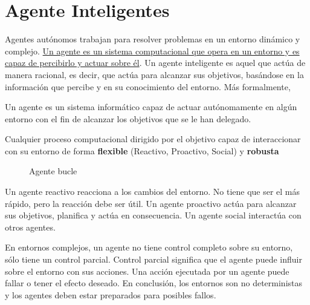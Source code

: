 \chapter{Agente Inteligentes}

Agentes autónomos trabajan para resolver problemas en un entorno dinámico y complejo. \ul{Un agente es un sistema computacional que opera en un entorno y es capaz de percibirlo y actuar sobre él}. Un agente inteligente es aquel que actúa de manera racional, es decir, que actúa para alcanzar sus objetivos, basándose en la información que percibe y en su conocimiento del entorno.
Más formalmente,
\begin{definition}
   [Wooldrdige]
   Un agente es un sistema informático
   capaz de actuar autónomamente en algún
   entorno con el fin de alcanzar los objetivos
   que se le han delegado.
\end{definition}

\begin{definition}
   Cualquier proceso computacional dirigido por el objetivo capaz
   de interaccionar con su entorno de forma \textbf{flexible} (Reactivo, Proactivo, Social) y \textbf{robusta}
\end{definition}

\begin{figure}[htbp]
   \centering

   \caption{Agente bucle}
   \label{fig:agenteBucle}
\end{figure}

Un agente reactivo reacciona a los cambios del entorno. No tiene que ser el más rápido, pero la reacción debe ser útil. Un agente proactivo actúa para alcanzar sus objetivos, planifica y actúa en consecuencia. Un agente social interactúa con otros agentes.

En entornos complejos, un agente no tiene control completo sobre su entorno, sólo tiene un control parcial. Control parcial significa que el agente puede influir sobre el entorno con sus acciones. Una acción ejecutada por un agente puede fallar o tener el efecto deseado. En conclusión, los entornos son no deterministas y los agentes deben estar preparados para posibles fallos.

